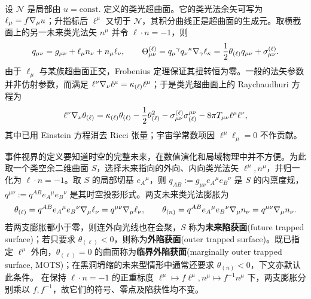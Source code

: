 设 $\mathcal N$ 是局部由 $u=\mathrm{const.}$ 定义的类光超曲面。它的类光法余矢可写为 $\ell_\mu=f\nabla_\mu u$；升指标后 $\ell^\mu$ 又切于 $\mathcal N$，其积分曲线正是超曲面的生成元。取横截面上的另一未来类光法矢 $n^\mu$ 并令 $\ell\cdot n=-1$，则
\[
    q_{\mu\nu}=g_{\mu\nu}+\ell_\mu n_\nu+n_\mu\ell_\nu,
    \qquad
    \Theta^{(\ell)}_{\mu\nu}=q_\mu{}^\gamma q_\nu{}^\kappa\nabla_\gamma\ell_\kappa
       =\frac12\theta_{(\ell)}q_{\mu\nu}+\sigma^{(\ell)}_{\mu\nu}.
\]
由于 $\ell_\mu$ 与某族超曲面正交，Frobenius 定理保证其扭转恒为零。一般的法矢参数并非仿射参数，而满足 $\ell^\nu\nabla_\nu\ell^\mu=\kappa_{(\ell)}\ell^\mu$；于是类光超曲面上的 Raychaudhuri 方程为
\begin{equation}
    \ell^\nu\nabla_\nu\theta_{(\ell)}
    =\kappa_{(\ell)}\theta_{(\ell)}
      -\frac12\theta_{(\ell)}^2
      -\sigma^{(\ell)}_{\mu\nu}\sigma_{(\ell)}^{\mu\nu}
      -8\pi T_{\mu\nu}\ell^\mu\ell^\nu,
\end{equation}
其中已用 Einstein 方程消去 Ricci 张量；宇宙学常数项因 $\ell^\mu\ell_\mu=0$ 不作贡献。

事件视界的定义要知道时空的完整未来，在数值演化和局域物理中并不方便。为此取一个类空余二维曲面 $S$，选择未来指向的外向、内向类光法矢 $\ell^\mu,n^\mu$，并归一化为 $\ell\cdot n=-1$。取 $S$ 的局部切基 $e_A{}^\mu$，则 $q_{AB}:=g_{\mu\nu}e_A{}^\mu e_B{}^\nu$ 是 $S$ 的内禀度规，$q^{\mu\nu}:=q^{AB}e_A{}^\mu e_B{}^\nu$ 是其时空投影形式。两支未来类光法膨胀为
\begin{equation}\label{eq:null-expansions}
    \theta_{(\ell)}=q^{AB}e_A{}^\mu e_B{}^\nu\nabla_\mu\ell_\nu
    =q^{\mu\nu}\nabla_\mu\ell_\nu,
    \qquad
    \theta_{(n)}=q^{AB}e_A{}^\mu e_B{}^\nu\nabla_\mu n_\nu
    =q^{\mu\nu}\nabla_\mu n_\nu.
\end{equation}
若两支膨胀都小于零，则连外向光线也在会聚，$S$ 称为\textbf{未来陷获面}(future trapped surface)；若只要求 $\theta_{(\ell)}<0$，则称为\textbf{外陷获面}(outer trapped surface)。既已指定 $\ell^\mu$ 外向，$\theta_{(\ell)}=0$ 的曲面称为\textbf{临界外陷获面}(marginally outer trapped surface, MOTS)；在黑洞坍缩的未来型情形中通常还要求 $\theta_{(n)}<0$，下文亦默认此条件。
在保持 $\ell\cdot n=-1$ 的正重标度 $\ell^\mu\mapsto f\ell^\mu,n^\mu\mapsto f^{-1}n^\mu$ 下，两支膨胀分别乘以 $f,f^{-1}$，故它们的符号、零点及陷获性均不变。

